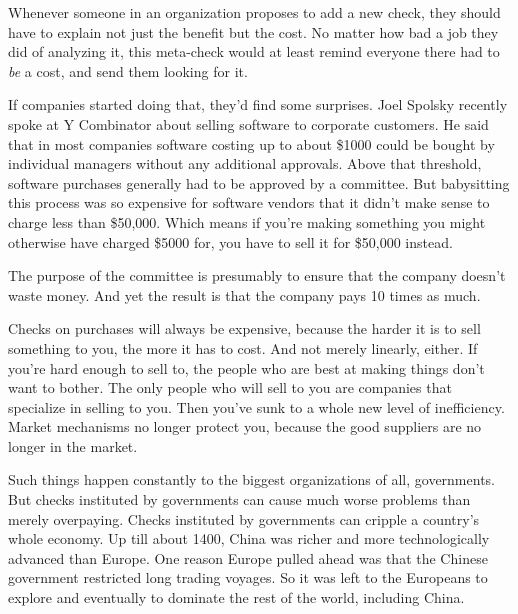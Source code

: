 Whenever
                  someone in an organization proposes to add a new check, they
                  should have to explain not just the benefit but the cost. No
                  matter how bad a job they did of analyzing it, this meta-check
                  would at least remind everyone there had to \emph{be} a cost,
                  and send them looking for it.

If companies started
                  doing that, they'd find some surprises. Joel Spolsky recently
                  spoke at Y Combinator about selling software to corporate
                  customers. He said that in most companies software costing up
                  to about \$1000 could be bought by individual managers without
                  any additional approvals. Above that threshold, software
                  purchases generally had to be approved by a committee. But
                  babysitting this process was so expensive for software vendors
                  that it didn't make sense to charge less than \$50,000. Which
                  means if you're making something you might otherwise have
                  charged \$5000 for, you have to sell it for \$50,000 instead.

The
                  purpose of the committee is presumably to ensure that the
                  company doesn't waste money. And yet the result is that the
                  company pays 10 times as much.

Checks on purchases
                  will always be expensive, because the harder it is to sell
                  something to you, the more it has to cost. And not merely
                  linearly, either. If you're hard enough to sell to, the people
                  who are best at making things don't want to bother. The only
                  people who will sell to you are companies that specialize in
                  selling to you. Then you've sunk to a whole new level of
                  inefficiency. Market mechanisms no longer protect you, because
                  the good suppliers are no longer in the market.

Such
                  things happen constantly to the biggest organizations of all,
                  governments. But checks instituted by governments can cause
                  much worse problems than merely overpaying. Checks instituted
                  by governments can cripple a country's whole economy. Up till
                  about 1400, China was richer and more technologically advanced
                  than Europe. One reason Europe pulled ahead was that the
                  Chinese government restricted long trading voyages. So it was
                  left to the Europeans to explore and eventually to dominate
                  the rest of the world, including China.

